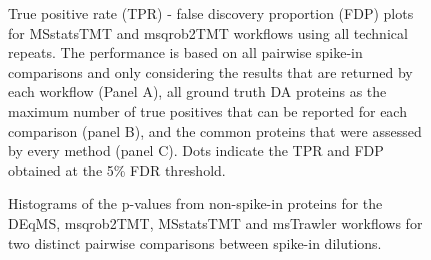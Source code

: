 \documentclass[
  letterpaper,
  DIV=11,
  numbers=noendperiod]{scrartcl}
\begin{document}
\begin{figure}[H]


\caption{\label{fig-WorkflowComparisonsTechreps}True positive rate (TPR)
- false discovery proportion (FDP) plots for MSstatsTMT and msqrob2TMT
workflows using all technical repeats. The performance is based on all
pairwise spike-in comparisons and only considering the results that are
returned by each workflow (Panel A), all ground truth DA proteins as the
maximum number of true positives that can be reported for each
comparison (panel B), and the common proteins that were assessed by
every method (panel C). Dots indicate the TPR and FDP obtained at the
5\% FDR threshold.}

\end{figure}%

\begin{figure}[H]


\caption{\label{fig-spikein1_pvalue_dist_nondiff}Histograms of the
p-values from non-spike-in proteins for the DEqMS, msqrob2TMT,
MSstatsTMT and msTrawler workflows for two distinct pairwise comparisons
between spike-in dilutions.}

\end{figure}%
\end{document}
